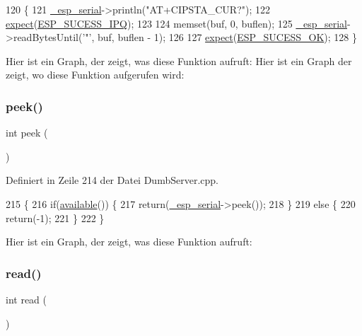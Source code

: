 \begin{DoxyCode}
120 \{
121   \hyperlink{classEspServer_a552aab874ad99b696f4c997d6f5a4746}{\_esp\_serial}->println(\textcolor{stringliteral}{"AT+CIPSTA\_CUR?"});
122   \hyperlink{classEspServer_aff5ea67ab96af075223b2b836036ccf1}{expect}(\hyperlink{DumbServer_8cpp_a4a3c8fcc7b628944ea321ad928a00bd9}{ESP\_SUCESS\_IPQ});
123 
124   memset(buf, 0, buflen);
125   \hyperlink{classEspServer_a552aab874ad99b696f4c997d6f5a4746}{\_esp\_serial}->readBytesUntil(\textcolor{charliteral}{'"'}, buf, buflen - 1);
126 
127   \hyperlink{classEspServer_aff5ea67ab96af075223b2b836036ccf1}{expect}(\hyperlink{DumbServer_8cpp_a62497fcb12b1cedd5fdfbc0755508d87}{ESP\_SUCESS\_OK});
128 \}
\end{DoxyCode}
Hier ist ein Graph, der zeigt, was diese Funktion aufruft\+:
Hier ist ein Graph der zeigt, wo diese Funktion aufgerufen wird\+:
\mbox{\label{classEspServer_a9040fa1d479d71edf3a826f4691c35c4}} 
\subsubsection{\texorpdfstring{peek()}{peek()}}
{\footnotesize\ttfamily int peek (\begin{DoxyParamCaption}{ }\end{DoxyParamCaption})\hspace{0.3cm}{\ttfamily [virtual]}}



Definiert in Zeile 214 der Datei Dumb\+Server.\+cpp.


\begin{DoxyCode}
215 \{
216   \textcolor{keywordflow}{if}(\hyperlink{classEspServer_a4549a76725f2e4c013e4d57018366109}{available}()) \{
217     \textcolor{keywordflow}{return}(\hyperlink{classEspServer_a552aab874ad99b696f4c997d6f5a4746}{\_esp\_serial}->peek());
218   \}
219   \textcolor{keywordflow}{else} \{
220     \textcolor{keywordflow}{return}(-1);
221   \}
222 \}
\end{DoxyCode}
Hier ist ein Graph, der zeigt, was diese Funktion aufruft\+:
\mbox{\label{classEspServer_aaab5dab5b969a87f538242e524431637}} 
\subsubsection{\texorpdfstring{read()}{read()}}
{\footnotesize\ttfamily int read (\begin{DoxyParamCaption}{ }\end{DoxyParamCaption})\hspace{0.3cm}{\ttfamily [virtual]}}




